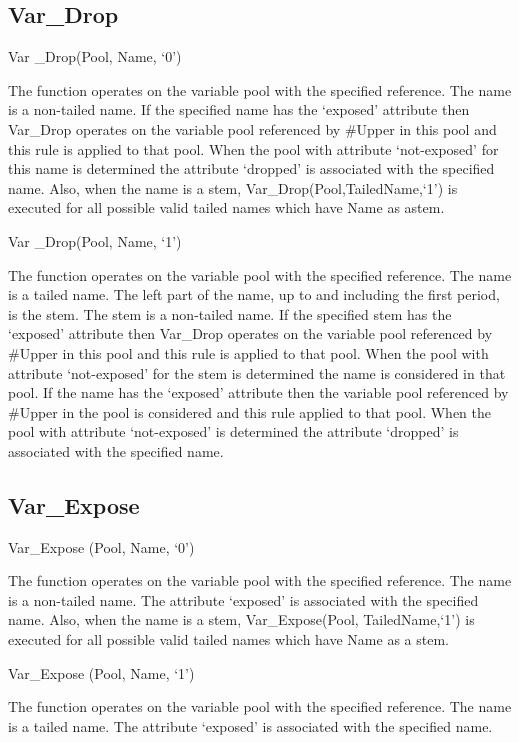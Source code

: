 \hypertarget{var_drop}{%
\subsection{Var\_Drop}\label{var_drop}}

Var \_Drop(Pool, Name, `0')

The function operates on the variable pool with the specified reference.
The name is a non-tailed name. If the specified name has the `exposed'
attribute then Var\_Drop operates on the variable pool referenced by
\#Upper in this pool and this rule is applied to that pool. When the
pool with attribute `not-exposed' for this name is determined the
attribute `dropped' is associated with the specified name. Also, when
the name is a stem, Var\_Drop(Pool,TailedName,`1') is executed for all
possible valid tailed names which have Name as astem.

Var \_Drop(Pool, Name, `1')

The function operates on the variable pool with the specified reference.
The name is a tailed name. The left part of the name, up to and
including the first period, is the stem. The stem is a non-tailed name.
If the specified stem has the `exposed' attribute then Var\_Drop
operates on the variable pool referenced by \#Upper in this pool and
this rule is applied to that pool. When the pool with attribute
`not-exposed' for the stem is determined the name is considered in that
pool. If the name has the `exposed' attribute then the variable pool
referenced by \#Upper in the pool is considered and this rule applied to
that pool. When the pool with attribute `not-exposed' is determined the
attribute `dropped' is associated with the specified name.

\hypertarget{var_expose}{%
\subsection{Var\_Expose}\label{var_expose}}

Var\_Expose (Pool, Name, `0')

The function operates on the variable pool with the specified reference.
The name is a non-tailed name. The attribute `exposed' is associated
with the specified name. Also, when the name is a stem,
Var\_Expose(Pool, TailedName,`1') is executed for all possible valid
tailed names which have Name as a stem.

Var\_Expose (Pool, Name, `1')

The function operates on the variable pool with the specified reference.
The name is a tailed name. The attribute `exposed' is associated with
the specified name.

